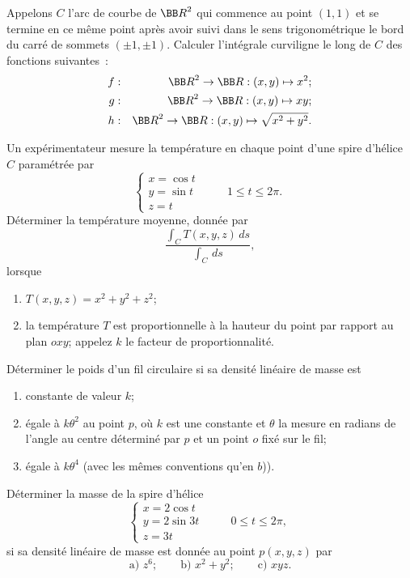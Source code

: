 \documentclass[12pt,french,oneside,a4paper]{memoir} %
\begin{document}
\begin{exo}
Appelons $C$ l'arc de courbe de ${\BB R}^2$ qui commence au point $(1,1)$ et 
se termine en ce même point après avoir suivi dans le sens trigonométrique 
le bord du carré de sommets $(\pm 1, \pm 1)$. Calculer l'intégrale curviligne le long 
de $C$ des fonctions suivantes~:
\begin{eqnarray*}
f &:& {\BB R}^2 \rightarrow {\BB R} : (x,y) \mapsto x^2; \\
g &:& {\BB R}^2 \rightarrow {\BB R} : (x,y) \mapsto xy; \\
h &:& {\BB R}^2 \rightarrow {\BB R} : (x,y) \mapsto \sqrt{x^2+y^2}.
\end{eqnarray*}
\end{exo}
\begin{exo}
Un expérimentateur mesure la température en chaque point d'une spire d'hélice 
$C$ paramétrée par
\begin{equation*}
\left\{
\begin{array}{ll}
x=\cos t &\\
y=\sin t &\qquad 1 \leq t \leq 2 \pi. \\
z=t&
\end{array}
\right.
\end{equation*}
Déterminer la température moyenne, donnée par
\begin{equation*}
\frac{\int_C T(x,y,z) \, ds}{\int_C \, ds},
\end{equation*}
lorsque
\begin{enumerate}
\item $T(x,y,z)=x^2+y^2+z^2$;
\item la température $T$ est proportionnelle à la hauteur du point par rapport 
au plan $oxy$; appelez $k$ le facteur de proportionnalité. 
\end{enumerate}
\end{exo}
\begin{exo}
Déterminer le poids d'un fil circulaire si sa densité linéaire de masse est
\begin{enumerate}
\item constante de valeur $k$;
\item égale à $k \theta^2$ au point $p$, où $k$ est une constante et $\theta$ 
la mesure en radians de l'angle au centre déterminé par $p$ et un point $o$ 
fixé sur le fil;
\item égale à $k \theta^4$ (avec les mêmes conventions qu'en $b$)).
\end{enumerate}
\end{exo}
\begin{exo}
Déterminer la masse de la spire d'hélice
\begin{equation*}
\left\{
\begin{array}{ll}
x=2 \cos t &\\
y = 2 \sin 3t &\qquad 0 \leq t \leq 2 \pi, \\
z=3 t &
\end{array}
\right.
\end{equation*}
si sa densité linéaire de masse est donnée au point $p(x,y,z)$ par
\begin{equation*}
\mbox{a) } z^6;\qquad \mbox{b) } x^2+y^2; \qquad \mbox{c) } xyz.
\end{equation*}
\end{exo}
\end{document}
